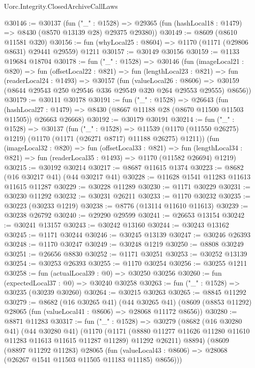 \begin{lexlean}{Uorc.Integrity.ClosedArchiveCallLaws}
\begin{coremodule}
@30146 := @30137
    (fun ("_" : @1528) =>
    @29365 (fun (hashLocal18 : @1479) => @8430 (@8570 @13139 @28) @29375 @29380))
@30149 := @8609 (@8610 @11581 @320)
@30156 := fun (whyLocal25 : @8604) => @1170 (@1171 (@29806 @8631) @29441 @29559) @1211
@30157 := @30149 @30156
@30159 := @1133 @19684 @18704
@30178 := fun ("_" : @1528) =>
  @30146
    (fun (imageLocal21 : @820) =>
    fun (offsetLocal22 : @821) =>
    fun (lengthLocal23 : @821) =>
    fun (readerLocal24 : @1493) =>
    @30157
      (fun (valueLocal26 : @8606) =>
      @30159 (@8644 @29543 @250 @29546 @336 @29549 @320 @264 @29553 @29555) @8656))
@30179 := @30111 @30178
@30191 := fun ("_" : @1528) =>
  @26643
    (fun (hashLocal27 : @1479) =>
    @8430 (@8667 @11188 @28 (@8670 @11500 @11503 @11505)) @26663 @26668)
@30192 := @30179 @30191
@30214 := fun ("_" : @1528) =>
  @30137
    (fun ("_" : @1528) =>
    @11539 (@1170 (@11550 @26275) @1219) (@1170 (@1171 (@26271 @8717) @11188 @26275) @1211))
    (fun (imageLocal32 : @820) =>
    fun (offsetLocal33 : @821) =>
    fun (lengthLocal34 : @821) => fun (readerLocal35 : @1493) => @1170 (@11582 @26694) @1219)
@30215 := @30192 @30214
@30217 := @8687 @11615 @1374
@30223 := @8682 (@16 @30217 @41) (@44 @30217 @41)
@30228 := @11628 @1541 @11283 @11613 @11615 @11287
@30229 := @30228 @11289
@30230 := @1171 @30229
@30231 := @30230 @11292
@30232 := @30231 @26211
@30233 := @1170 @30232
@30235 := @30223 (@30233 @1219)
@30238 := @8776 (@13114 @11610 @11613)
@30239 := @30238 @26792
@30240 := @29290 @29599
@30241 := @26653 @13154
@30242 := @30241 @13157
@30243 := @30242 @13160
@30244 := @30243 @13162
@30245 := @1171 @30244
@30246 := @30245 @13139
@30247 := @30246 @26393
@30248 := @1170 @30247
@30249 := @30248 @1219
@30250 := @8808 @30249
@30251 := @26656 @8830
@30252 := @1171 @30251
@30253 := @30252 @13139
@30254 := @30253 @26393
@30255 := @1170 @30254
@30256 := @30255 @1211
@30258 := fun (actualLocal39 : @0) => @30250 @30256
@30260 := fun (expectedLocal37 : @0) => @30240 @30258
@30263 := fun ("_" : @1528) => @30235 (@30239 @30260)
@30264 := @30215 @30263
@30265 := @8845 @11292
@30279 := @8682
    (@16 @30265 @41)
    (@44 @30265 @41)
    (@8609 (@8853 @11292) @28065 (fun (valueLocal41 : @8606) => @28068 @11172 @8656))
@30280 := @8871 @11283
@30317 := fun ("_" : @1528) =>
  @30279
    (@8682
      (@16 @30280 @41)
      (@44 @30280 @41)
      (@1170
        (@1171 (@8880 @11277 @11626 @11280 @11610 @11283 @11613 @11615 @11287 @11289) @11292 @26211)
        @8894)
      (@8609
        (@8897 @11292 @11283)
        @28065
        (fun (valueLocal43 : @8606) => @28068 (@26267 @1541 @11503 @11505 @11183 @11185) @8656)))

\end{coremodule}
\end{lexlean}
